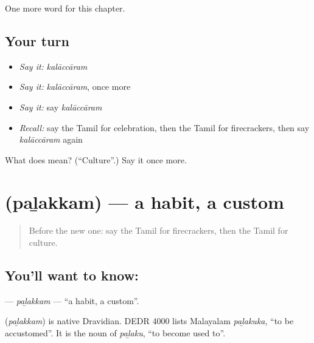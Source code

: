 \begin{grammarlens}[title={What you've built}]
One more word for this chapter.
\end{grammarlens}

\subsection*{Your turn}
\begin{itemize}
\raggedright
  \item \emph{Say it:} \emph{kalāccāram}
  \item \emph{Say it:} \emph{kalāccāram}, once more
  \item \emph{Say it:} say \emph{kalāccāram}
  \item \emph{Recall:} say the Tamil for celebration, then the Tamil for firecrackers, then say \emph{kalāccāram} again
\end{itemize}

\begin{tcolorbox}[breakable,colback=teal!4,colframe=teal!35!black,title={Before you move on}]
What does  mean? (\textquotedblleft{}Culture\textquotedblright{}.) Say it once more.
\end{tcolorbox}
\section[\texorpdfstring{\ta{பழக்கம்} (paḻakkam)}{பழக்கம் (paḻakkam)}]{ (paḻakkam) — a habit, a custom}

\label{lesson:TA-C246-palakkam}



\begin{quote}
Before the new one: say the Tamil for firecrackers, then the Tamil for culture.
\end{quote}

\subsection*{You'll want to know: }
\textbf{} — \emph{paḻakkam} — \textquotedblleft{}a habit, a custom\textquotedblright{}.

\begin{cousinweb}
\textbf{} (\emph{paḻakkam}) is native Dravidian. DEDR 4000 lists Malayalam \emph{paḻakuka}, \textquotedblleft{}to be accustomed\textquotedblright{}. It is the noun of \emph{paḻaku}, \textquotedblleft{}to become used to\textquotedblright{}.
\end{cousinweb}

